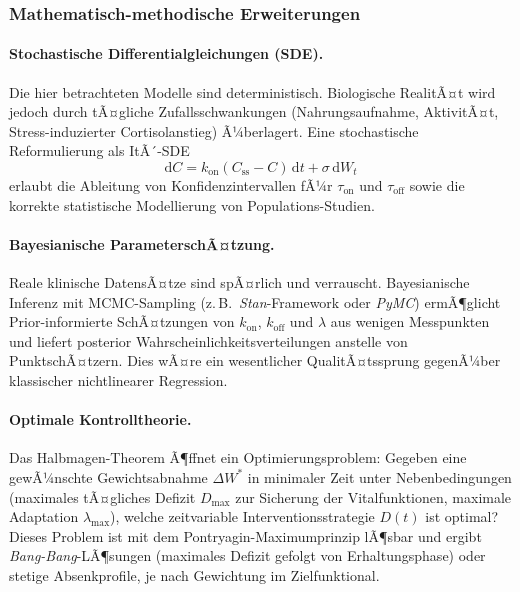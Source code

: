﻿\documentclass[12pt,a4paper]{article}
\theoremstyle{plain}
\theoremstyle{definition}
\theoremstyle{remark}
\begin{document}
\subsubsection{Mathematisch-methodische Erweiterungen}

\paragraph{Stochastische Differentialgleichungen (SDE).}
Die hier betrachteten Modelle sind deterministisch. Biologische RealitÃ¤t wird
jedoch durch tÃ¤gliche Zufallsschwankungen (Nahrungsaufnahme, AktivitÃ¤t,
Stress-induzierter Cortisolanstieg) Ã¼berlagert. Eine stochastische
Reformulierung als ItÃ´-SDE
\begin{equation}
  \mathrm{d}C = k_\text{on}(C_\text{ss} - C)\,\mathrm{d}t + \sigma \, \mathrm{d}W_t
\end{equation}
erlaubt die Ableitung von Konfidenzintervallen fÃ¼r $\tau_\text{on}$ und
$\tau_\text{off}$ sowie die korrekte statistische Modellierung von
Populations-Studien.

\paragraph{Bayesianische ParameterschÃ¤tzung.}
Reale klinische DatensÃ¤tze sind spÃ¤rlich und verrauscht.
Bayesianische Inferenz mit MCMC-Sampling (z.\,B.\
\textit{Stan}-Framework oder \textit{PyMC}) ermÃ¶glicht
Prior-informierte SchÃ¤tzungen von $k_\text{on}$, $k_\text{off}$ und
$\lambda$ aus wenigen Messpunkten und liefert posterior Wahrscheinlichkeitsverteilungen
anstelle von PunktschÃ¤tzern. Dies wÃ¤re ein wesentlicher QualitÃ¤tssprung
gegenÃ¼ber klassischer nichtlinearer Regression.

\paragraph{Optimale Kontrolltheorie.}
Das Halbmagen-Theorem Ã¶ffnet ein Optimierungsproblem: Gegeben eine
gewÃ¼nschte Gewichtsabnahme $\Delta W^*$ in minimaler Zeit unter
Nebenbedingungen (maximales tÃ¤gliches Defizit $D_\text{max}$ zur Sicherung
der Vitalfunktionen, maximale Adaptation $\lambda_\text{max}$), welche
zeitvariable Interventionsstrategie $D(t)$ ist optimal? Dieses Problem ist
mit dem Pontryagin-Maximumprinzip lÃ¶sbar und ergibt \emph{Bang-Bang}-LÃ¶sungen
(maximales Defizit gefolgt von Erhaltungsphase) oder stetige Absenkprofile,
je nach Gewichtung im Zielfunktional.
\end{document}

